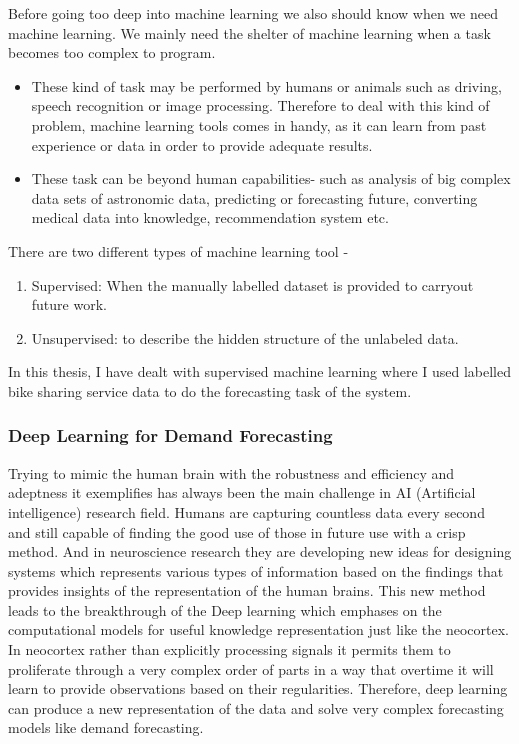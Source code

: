 Before going too deep into machine learning we also should know when we need machine learning. We mainly need the shelter of machine learning when a task becomes too complex to program. 
\begin{itemize}
\item These kind of task may be performed by humans or animals such as driving, speech recognition or image processing. Therefore to deal with this kind of problem, machine learning tools comes in handy, as it can learn from past experience or data in order to provide adequate results. 
\item These task can be beyond human capabilities- such as analysis of big complex data sets of astronomic data, predicting or forecasting future, converting medical data into knowledge, recommendation system etc. 
\end{itemize}

There are two different types of machine learning tool - 
\begin{enumerate} 
\item Supervised: When the manually labelled dataset is provided to carryout future work. 
\item Unsupervised: to describe the hidden structure of the unlabeled data. 
\end{enumerate} 
In this thesis, I have dealt with supervised machine learning where I used labelled bike sharing service data to do the forecasting task of the system.


\subsubsection{Deep Learning for Demand Forecasting}
\label{DeepLearning}

Trying to mimic the human brain with the robustness and efficiency and adeptness it exemplifies has always been the main challenge in AI (Artificial intelligence) research field. Humans are capturing countless data every second and still capable of finding the good use of those in future use with a crisp method. And in neuroscience research they are developing new ideas for designing systems which represents various types of information based on the findings that provides insights of the representation of the human brains. This new method leads to the breakthrough of the Deep learning which emphases on the computational models for useful knowledge representation just like the neocortex. In neocortex rather than explicitly processing signals it permits them to proliferate through a very complex order of parts in a way that overtime it will learn to provide observations based on their regularities. Therefore, deep learning can produce a new representation of the data and solve very complex forecasting models like demand forecasting.

